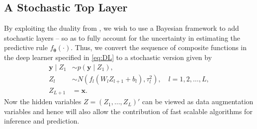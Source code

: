 \documentclass[ba]{imsart}
\newcommand{\bm}[1]{\boldsymbol{#1}}
\def\x{\bm{x}}
\def\y{\bm{y}}
\def\btheta{\bm{\theta}}
\numberwithin{equation}{section}
\theoremstyle{plain}
\begin{document}
\subsection{A  Stochastic Top  Layer}

By exploiting the duality from ,  we  wish to  use a Bayesian framework to add stochastic layers -- so as to  fully  account  for the uncertainty in estimating the  predictive rule $f_{\btheta}(\cdot)$. Thus, we convert the sequence  of composite functions in the deep learner  specified  in \eqref{eq:DL} to  a stochastic version given by 
\begin{equation}\label{eq:DL_stochastic}
\begin{split}
\y \mid Z_1 &\sim p(\y \mid Z_1), \\
Z_{l} &\sim N(f_{l}(W_{l} Z_{l+1}+b_{l}), \tau_{l}^2), \quad l=1,2, \ldots, L, \\
Z_{L+1}&=\x.
\end{split}
\end{equation}
Now the hidden variables $Z=(Z_1, \ldots, Z_L)'$  can be viewed as data augmentation variables and hence will also allow the contribution of fast scalable algorithms for  inference  and  prediction.
\end{document}
